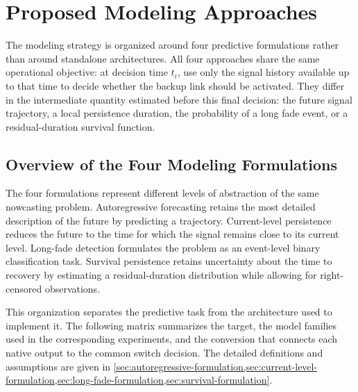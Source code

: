 \chapter{Proposed Modeling Approaches}
\label{chap:task-formulations}

The modeling strategy is organized around four predictive formulations rather
than around standalone architectures. All four approaches share the same
operational objective: at decision time \(t_i\), use only the signal history
available up to that time to decide whether the backup link should be activated.
They differ in the intermediate quantity estimated before this final decision:
the future signal trajectory, a local persistence duration, the probability of
a long fade event, or a residual-duration survival function.

\section{Overview of the Four Modeling Formulations}
\label{sec:overview-modeling-formulations}

The four formulations represent different levels of abstraction of the same
nowcasting problem. Autoregressive forecasting retains the most detailed
description of the future by predicting a trajectory. Current-level persistence
reduces the future to the time for which the signal remains close to its current
level. Long-fade detection formulates the problem as an event-level binary
classification task. Survival persistence retains uncertainty about the time to
recovery by estimating a residual-duration distribution while allowing for
right-censored observations.

This organization separates the predictive task from the architecture used to
implement it. The following matrix summarizes the target, the model families
used in the corresponding experiments, and the conversion that connects each
native output to the common switch decision. The detailed definitions and
assumptions are given in \cref{sec:autoregressive-formulation,sec:current-level-formulation,sec:long-fade-formulation,sec:survival-formulation}.

